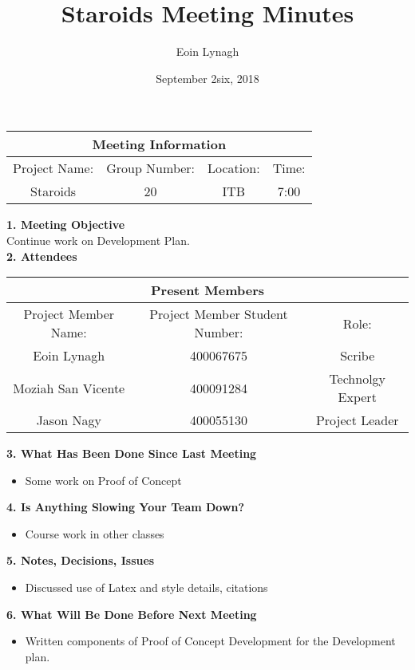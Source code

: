 \documentclass[12pt]{article}
\title{Staroids Meeting Minutes}
\author{Eoin Lynagh}
\date{September 2six, 2018}
\begin{document}
\maketitle
\begin{center}
 \begin{tabular}{| c | c | c |  c |} 
 \hline
 \multicolumn{4}{|c|}{Meeting Information} \\
\hline
 Project Name: & Group Number: & Location: & Time: \\ 
 \hline
 Staroids & 20 & ITB & 7:00 \\
\hline
\end{tabular}
\end{center}
\begin{flushleft}


\textbf{1. Meeting Objective}\\
Continue work on Development Plan.\\

\textbf{2. Attendees}\\
\begin{center}
 \begin{tabular}{|c | c | c | } 
 \hline
 \multicolumn{3}{|c|}{Present Members} \\
\hline
 Project Member Name: & Project Member Student Number: & Role: \\ 
 \hline\hline
 Eoin Lynagh & 400067675 & Scribe \\
\hline
Moziah San Vicente & 400091284 & Technolgy Expert \\
\hline
 Jason Nagy & 400055130 & Project Leader \\
\hline
\end{tabular}
\end{center}

\textbf{3. What Has Been Done Since Last Meeting}\\
\begin{itemize}
\item Some work on Proof of Concept
\end{itemize}

\textbf{4. Is Anything Slowing Your Team Down?}\\
\begin{itemize}
\item Course work in other classes
\end{itemize}

\textbf{5. Notes, Decisions, Issues}\\
\begin{itemize}
\item Discussed use of Latex and style details, citations\\
\end{itemize}
\textbf{6. What Will Be Done Before Next Meeting}\\
\begin{itemize}
\item Written components of Proof of Concept Development for the Development plan.


\end{itemize}
\end{flushleft}
\end{document}
